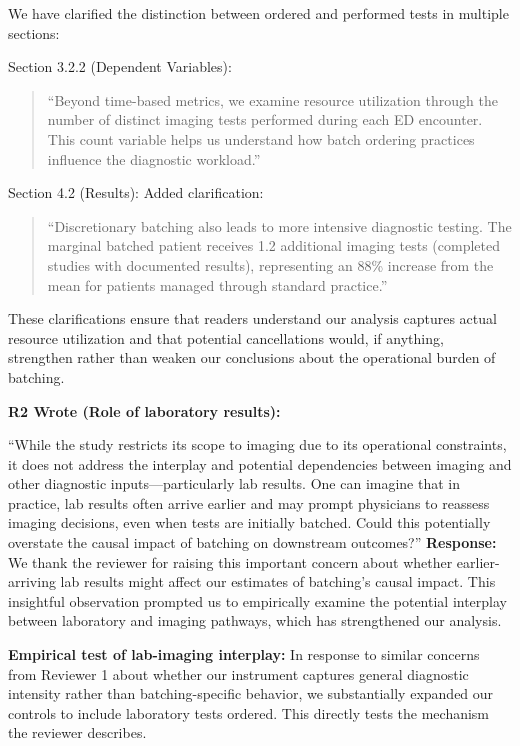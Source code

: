 \documentclass[11pt]{article}
\newenvironment{quote2}
{ \bigskip
\noindent
         \small\em
         \baselineskip=14pt
}
\newcommand{\1}{\hbox{\rm 1\kern-.35em 1}}
\begin{document}
We have clarified the distinction between ordered and performed tests in multiple sections:

Section 3.2.2 (Dependent Variables): 
\begin{quote}
``Beyond time-based metrics, we examine resource utilization through the number of distinct imaging tests performed during each ED encounter. This count variable helps us understand how batch ordering practices influence the diagnostic workload.''
\end{quote}

Section 4.2 (Results): Added clarification: 
\begin{quote}
``Discretionary batching also leads to more intensive diagnostic testing. The marginal batched patient receives 1.2 additional imaging tests (completed studies with documented results), representing an 88\% increase from the mean for patients managed through standard practice.''
\end{quote}


These clarifications ensure that readers understand our analysis captures actual resource utilization and that potential cancellations would, if anything, strengthen rather than weaken our conclusions about the operational burden of batching.

\color{black}

\begin{quote2}
\textbf{R2 Wrote (Role of laboratory results):}  

\noindent``While the study restricts its scope to imaging due to its operational constraints, it does not address the interplay and potential dependencies between imaging and other diagnostic inputs—particularly lab results. One can imagine that in practice, lab results often arrive earlier and may prompt physicians to reassess imaging decisions, even when tests are initially batched. Could this potentially overstate the causal impact of batching on downstream outcomes?'' 
\end{quote2}

\noindent\textbf{Response:} \color{blue}
We thank the reviewer for raising this important concern about whether earlier-arriving lab results might affect our estimates of batching's causal impact. This insightful observation prompted us to empirically examine the potential interplay between laboratory and imaging pathways, which has strengthened our analysis.

\textbf{Empirical test of lab-imaging interplay:} In response to similar concerns from Reviewer 1 about whether our instrument captures general diagnostic intensity rather than batching-specific behavior, we substantially expanded our controls to include laboratory tests ordered. This directly tests the mechanism the reviewer describes.
\end{document}
